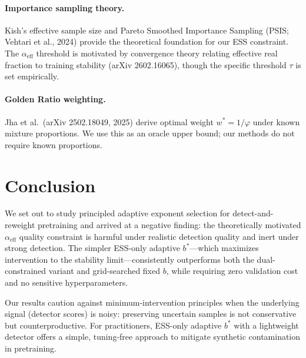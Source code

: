 \documentclass[11pt]{article}
\begin{document}
\paragraph{Importance sampling theory.} Kish's effective sample size and Pareto Smoothed Importance Sampling (PSIS; Vehtari et al., 2024) provide the theoretical foundation for our ESS constraint. The $\alpha_{\mathrm{eff}}$ threshold is motivated by convergence theory relating effective real fraction to training stability (arXiv 2602.16065), though the specific threshold $\tau$ is set empirically.

\paragraph{Golden Ratio weighting.} Jha et al.\ (arXiv 2502.18049, 2025) derive optimal weight $w^* = 1/\varphi$ under known mixture proportions. We use this as an oracle upper bound; our methods do not require known proportions.

\section{Conclusion}
\label{sec:conclusion}

We set out to study principled adaptive exponent selection for detect-and-reweight pretraining and arrived at a negative finding: the theoretically motivated $\alpha_{\mathrm{eff}}$ quality constraint is harmful under realistic detection quality and inert under strong detection. The simpler ESS-only adaptive $b^*$---which maximizes intervention to the stability limit---consistently outperforms both the dual-constrained variant and grid-searched fixed $b$, while requiring zero validation cost and no sensitive hyperparameters.

Our results caution against minimum-intervention principles when the underlying signal (detector scores) is noisy: preserving uncertain samples is not conservative but counterproductive. For practitioners, ESS-only adaptive $b^*$ with a lightweight detector offers a simple, tuning-free approach to mitigate synthetic contamination in pretraining.



\end{document}

